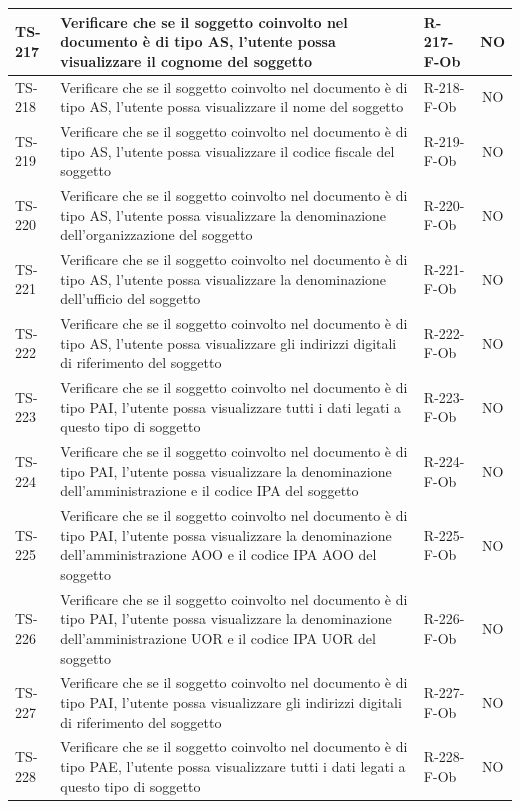 \documentclass[a4paper,12pt]{article}
\begin{document}
\begin{longtable}{|p{1.5cm}|p{8.3cm}|p{2.4cm}|c|}
\hline
TS-217 & Verificare che se il soggetto coinvolto nel documento è di tipo AS, l'utente possa visualizzare il cognome del soggetto & R-217-F-Ob & NO \\
\hline
TS-218 & Verificare che se il soggetto coinvolto nel documento è di tipo AS, l'utente possa visualizzare il nome del soggetto & R-218-F-Ob & NO \\
\hline
TS-219 & Verificare che se il soggetto coinvolto nel documento è di tipo AS, l'utente possa visualizzare il codice fiscale del soggetto & R-219-F-Ob & NO \\
\hline
TS-220 & Verificare che se il soggetto coinvolto nel documento è di tipo AS, l'utente possa visualizzare la denominazione dell'organizzazione del soggetto & R-220-F-Ob & NO \\
\hline
TS-221 & Verificare che se il soggetto coinvolto nel documento è di tipo AS, l'utente possa visualizzare la denominazione dell'ufficio del soggetto & R-221-F-Ob & NO \\
\hline
TS-222 & Verificare che se il soggetto coinvolto nel documento è di tipo AS, l'utente possa visualizzare gli indirizzi digitali di riferimento del soggetto & R-222-F-Ob & NO \\
\hline
TS-223 & Verificare che se il soggetto coinvolto nel documento è di tipo PAI, l'utente possa visualizzare tutti i dati legati a questo tipo di soggetto & R-223-F-Ob & NO \\
\hline
TS-224 & Verificare che se il soggetto coinvolto nel documento è di tipo PAI, l'utente possa visualizzare la denominazione dell'amministrazione e il codice IPA del soggetto & R-224-F-Ob & NO \\
\hline
TS-225 & Verificare che se il soggetto coinvolto nel documento è di tipo PAI, l'utente possa visualizzare la denominazione dell'amministrazione AOO e il codice IPA AOO del soggetto & R-225-F-Ob & NO \\
\hline
TS-226 & Verificare che se il soggetto coinvolto nel documento è di tipo PAI, l'utente possa visualizzare la denominazione dell'amministrazione UOR e il codice IPA UOR del soggetto & R-226-F-Ob & NO \\
\hline
TS-227 & Verificare che se il soggetto coinvolto nel documento è di tipo PAI, l'utente possa visualizzare gli indirizzi digitali di riferimento del soggetto & R-227-F-Ob & NO \\
\hline
TS-228 & Verificare che se il soggetto coinvolto nel documento è di tipo PAE, l'utente possa visualizzare tutti i dati legati a questo tipo di soggetto & R-228-F-Ob & NO \\

\end{longtable}
\end{document}
